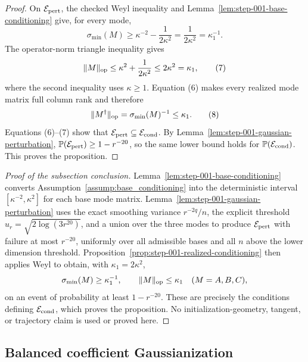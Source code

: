 \begin{proof}
On \(\mathcal E_{\rm pert}\), the checked Weyl
inequality and Lemma~\ref{lem:step-001-base-conditioning} give, for every mode,
\[
  \sigma_{\min}(M)
  \ge\kappa^{-2}-\frac1{2\kappa^2}
  =\frac1{2\kappa^2}
  =\kappa_1^{-1}.                                           \tag{6}
\]
The operator-norm triangle inequality gives
\[
  \|M\|_{\rm op}
  \le\kappa^2+\frac1{2\kappa^2}
  \le2\kappa^2
  =\kappa_1,                                                \tag{7}
\]
where the second inequality uses \(\kappa\ge1\). Equation (6) makes every
realized mode matrix full column rank and therefore
\[
  \|M^\dagger\|_{\rm op}
  =\sigma_{\min}(M)^{-1}
  \le\kappa_1.                                              \tag{8}
\]
Equations (6)--(7) show that
\(\mathcal E_{\rm pert}\subseteq\mathcal E_{\rm cond}\). By
Lemma~\ref{lem:step-001-gaussian-perturbation},
\(\mathbb P(\mathcal E_{\rm pert})\ge1-r^{-20}\), so the same lower bound
holds for \(\mathbb P(\mathcal E_{\rm cond})\). This proves the proposition.

\end{proof}

\begin{proof}[Proof of the subsection conclusion]

Lemma~\ref{lem:step-001-base-conditioning} converts
Assumption~\ref{assump:base_conditioning} into the deterministic interval
\([\kappa^{-2},\kappa^2]\) for each base mode matrix.
Lemma~\ref{lem:step-001-gaussian-perturbation} uses the exact smoothing
variance \(r^{-2q}/n\), the explicit threshold
\(u_r=\sqrt{2\log(3r^{20})}\), and a union over the three modes to produce
\(\mathcal E_{\rm pert}\) with failure at most \(r^{-20}\), uniformly over
all admissible bases and all \(n\) above the lower dimension threshold.
Proposition~\ref{prop:step-001-realized-conditioning} then applies Weyl to
obtain, with \(\kappa_1=2\kappa^2\),
\[
  \sigma_{\min}(M)\ge\kappa_1^{-1},\qquad
  \|M\|_{\rm op}\le\kappa_1
  \quad(M=A,B,C),
\]
on an event of probability at least \(1-r^{-20}\). These are precisely the
conditions defining \(\mathcal E_{\rm cond}\), which proves the proposition.
No initialization-geometry, tangent, or trajectory claim is used
or proved here.

\end{proof}

\subsection{Balanced coefficient Gaussianization}\label{app:step-002}

